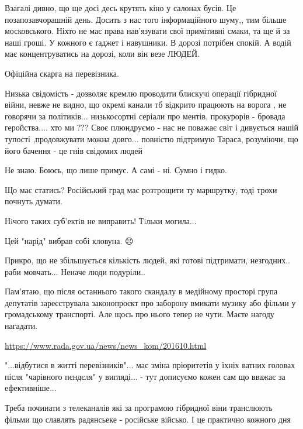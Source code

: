\begin{itemize}

Взагалі дивно, що ще досі десь крутять кіно у салонах бусів. Це
позапозавчорашній день. Досить з нас того інформаційного шуму,, тим більше
московського. Ніхто не має права нав'язувати свої примітивні смаки, та ще й за
наші гроші. У кожного є ґаджет і навушники. В дорозі потрібен спокій. А водій
має концентруватись на дорозі, коли він везе ЛЮДЕЙ.

Офіційна скарга на перевізника.


Низька свідомість - дозволяє кремлю проводити блискучі операції гібридної
війни, невже не видно, що окремі канали тб відкрито працюють на ворога , не
говорячи за політиків... низькосортні серіали про ментів, прокурорів - бровада
геройства.... хто ми ??? Своє плюндруємо - нас не поважає світ і дивується нашій
тупості ,продовжувати можна довго... повністю підтримую Тараса, розуміючи, що
його бачення - це гнів свідомих людей


Не знаю. Боюсь, що лише примус. А самі - ні. Сумно і гидко.

Що має статись? Російський град має розтрощити ту маршрутку, тоді трохи почнуть думати.

Нiчого таких суб'ектiв не виправить! Тiльки могила...

Цей "нарід" вибрав собі кловуна. ☹️

Прикро, що не збільшується кількість людей, які готові підтримати, незгодних.. раби мовчать... Неначе люди подуріли..


Пам'ятаю, що після останнього такого скандалу в медійному просторі група
депутатів зареєструвала законопроєкт про заборону вмикати музику або фільми у
громадському транспорті. Але щось про нього тепер не чути. Маєте нагоду
нагадати. 

\url{https://www.rada.gov.ua/news/news_kom/201610.html}


"...відбутися в житті перевізників"... має зміна пріоритетів у їхніх ватних
головах після "чарівного пєндєля" у вигляді... - тут дописуємо кожен сам що
вважає за ефективніше...



Треба починати з телеканалів які за програмою гібридної віни транслюють фільми
що славлять радянсьеке - російське військо. І це практично кожного дня



\end{itemize}
